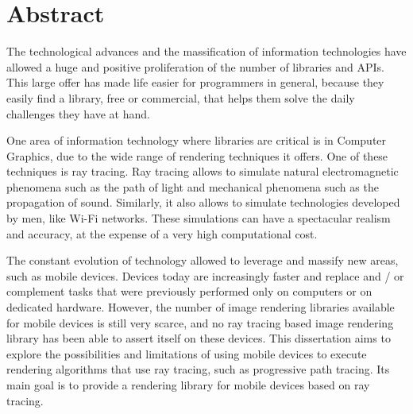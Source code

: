 \documentclass[
  oneside,
  11pt, a4paper,
  footinclude=true,
  headinclude=true,
  cleardoublepage=empty,
  bibliography=totocnumbered
]{scrbook}
\author{Tiago Manuel da Silva Santos}
\date{\myear} %
\begin{document}
\umfrontcover
\umtitlepage
	


\chapter*{Abstract}

\par
The technological advances and the massification of information technologies have allowed a huge and positive proliferation of the number of libraries and APIs.
This large offer has made life easier for programmers in general, because they easily find a library, free or commercial, that helps them solve the daily challenges they have at hand.

\par
One area of information technology where libraries are critical is in Computer Graphics, due to the wide range of rendering techniques it offers.
One of these techniques is ray tracing.
Ray tracing allows to simulate natural electromagnetic phenomena such as the path of light and mechanical phenomena such as the propagation of sound.
Similarly, it also allows to simulate technologies developed by men, like Wi-Fi networks.
These simulations can have a spectacular realism and accuracy, at the expense of a very high computational cost.

\par
The constant evolution of technology allowed to leverage and massify new areas, such as mobile devices.
Devices today are increasingly faster and replace and / or complement tasks that were previously performed only on computers or on dedicated hardware.
However, the number of image rendering libraries available for mobile devices is still very scarce, and no ray tracing based image rendering library has been able to assert itself on these devices.
This dissertation aims to explore the possibilities and limitations of using mobile devices to execute rendering algorithms that use ray tracing, such as progressive path tracing.
Its main goal is to provide a rendering library for mobile devices based on ray tracing.
\end{document}
